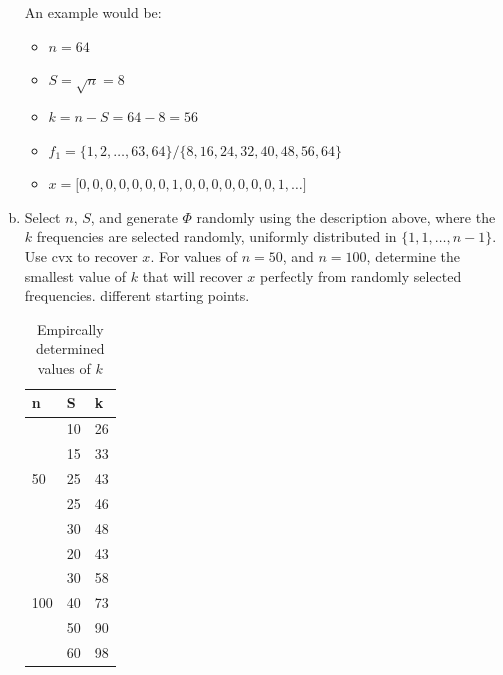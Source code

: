 \begin{enumerate}[(a)]
{An example would be:
\begin{itemize}
\item{$n = 64$}
\item{$S = \sqrt{n} = 8$}
\item{$k = n - S = 64 - 8 = 56$}
\item{$f_{1} = \{1,2, \ldots, 63, 64\}/\{8,16,24,32,40,48,56,64\}$}
\item{$x = \lbrack 0,0,0,0,0,0,0,1,0,0,0,0,0,0,0,1,\ldots\rbrack$}
\end{itemize}
  }
\item{Select $n$, $S$, and generate $\Phi$ randomly using the description
  above, where the $k$ frequencies are selected randomly, uniformly distributed
  in $\{1, 1, \ldots, n-1\}$. Use cvx to recover $x$. For values of $n=50$,
  and $n = 100$, determine the smallest value of $k$ that will recover $x$
  perfectly from randomly selected frequencies.
    different starting points.
\begin{table}[ht]
\centering
\begin{tabular}{|l|l|l|l|l|l|l|l|l|l|l|l|l|l|l|}
\hline
\multicolumn{5}{|l|}{n}                    & \multicolumn{5}{l|}{S}  & \multicolumn{5}{l|}{k}  \\ \hline
\multicolumn{5}{|l|}{\multirow{5}{*}{50}}  & \multicolumn{5}{l|}{10} & \multicolumn{5}{l|}{26} \\ \cline{6-15} 
\multicolumn{5}{|l|}{}                     & \multicolumn{5}{l|}{15} & \multicolumn{5}{l|}{33} \\ \cline{6-15} 
\multicolumn{5}{|l|}{}                     & \multicolumn{5}{l|}{25} & \multicolumn{5}{l|}{43} \\ \cline{6-15} 
\multicolumn{5}{|l|}{}                     & \multicolumn{5}{l|}{25} & \multicolumn{5}{l|}{46} \\ \cline{6-15} 
\multicolumn{5}{|l|}{}                     & \multicolumn{5}{l|}{30} & \multicolumn{5}{l|}{48} \\ \hline
\multicolumn{5}{|l|}{\multirow{5}{*}{100}} & \multicolumn{5}{l|}{20} & \multicolumn{5}{l|}{43} \\ \cline{6-15} 
\multicolumn{5}{|l|}{}                     & \multicolumn{5}{l|}{30} & \multicolumn{5}{l|}{58} \\ \cline{6-15} 
\multicolumn{5}{|l|}{}                     & \multicolumn{5}{l|}{40} & \multicolumn{5}{l|}{73} \\ \cline{6-15} 
\multicolumn{5}{|l|}{}                     & \multicolumn{5}{l|}{50} & \multicolumn{5}{l|}{90} \\ \cline{6-15} 
\multicolumn{5}{|l|}{}                     & \multicolumn{5}{l|}{60} & \multicolumn{5}{l|}{98} \\ \hline
\end{tabular}
\caption{Empircally determined values of $k$}
\label{my-label}
\end{table}

}
\end{enumerate}
